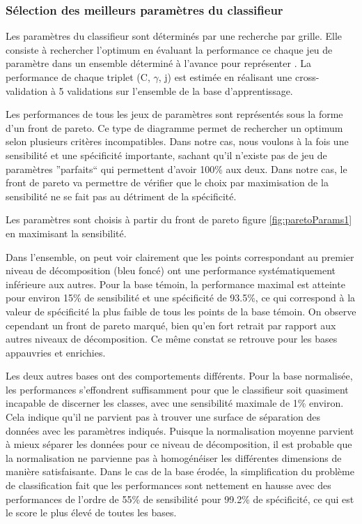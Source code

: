 \subsubsection{Sélection des meilleurs paramètres du classifieur}

Les paramètres du classifieur sont déterminés par une recherche par grille. Elle consiste à rechercher l'optimum en évaluant la performance ce chaque jeu de paramètre dans un ensemble déterminé à l'avance pour représenter . La performance de chaque triplet (C, $\gamma$, j) est estimée en réalisant une cross-validation à 5 validations sur l'ensemble de la base d'apprentissage.

Les performances de tous les jeux de paramètres sont représentés sous la forme d'un front de pareto. Ce type de diagramme permet de rechercher un optimum selon plusieurs critères incompatibles. Dans notre cas, nous voulons à la fois une sensibilité et une spécificité importante, sachant qu'il n'existe pas de jeu de paramètres ''parfaits`` qui permettent d'avoir 100\% aux deux. Dans notre cas, le front de pareto va permettre de vérifier que le choix par maximisation de la sensibilité ne se fait pas au détriment de la spécificité.

Les paramètres sont choisis à partir du front de pareto figure \ref{fig:paretoParams1} en maximisant la sensibilité.

Dans l'ensemble, on peut voir clairement que les points correspondant au premier niveau de décomposition (bleu foncé) ont une performance systématiquement inférieure aux autres. Pour la base témoin, la performance maximal est atteinte pour environ 15\% de sensibilité et une spécificité de 93.5\%, ce qui correspond à la valeur de spécificité la plus faible de tous les points de la base témoin. On observe cependant un front de pareto marqué, bien qu'en fort retrait par rapport aux autres niveaux de décomposition. Ce même constat se retrouve pour les bases appauvries et enrichies.

Les deux autres bases ont des comportements différents. Pour la base normalisée, les performances s'effondrent suffisamment pour que le classifieur soit quasiment incapable de discerner les classes, avec une sensibilité maximale de 1\% environ. Cela indique qu'il ne parvient pas à trouver une surface de séparation des données avec les paramètres indiqués. Puisque la normalisation moyenne parvient à mieux séparer les données pour ce niveau de décomposition, il est probable que la normalisation ne parvienne pas à homogénéiser les différentes dimensions de manière satisfaisante. Dans le cas de la base érodée, la simplification du problème de classification fait que les performances sont nettement en hausse avec des performances de l'ordre de 55\% de sensibilité pour 99.2\% de spécificité, ce qui est le score le plus élevé de toutes les bases.

